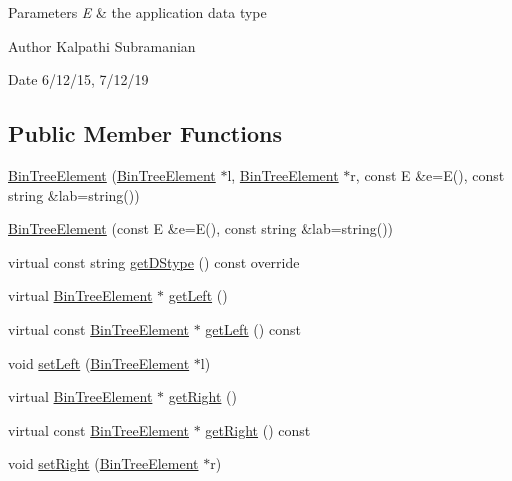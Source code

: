 \begin{DoxyParams}{Parameters}
{\em E} & the application data type\\
\hline
\end{DoxyParams}
\begin{DoxyAuthor}{Author}
Kalpathi Subramanian 
\end{DoxyAuthor}
\begin{DoxyDate}{Date}
6/12/15, 7/12/19 
\end{DoxyDate}
\subsection*{Public Member Functions}
\begin{DoxyCompactItemize}
\item 
\mbox{\hyperlink{classbridges_1_1datastructure_1_1_bin_tree_element_aaea6c57206cffc0be3204b971fcaf5dd}{Bin\+Tree\+Element}} (\mbox{\hyperlink{classbridges_1_1datastructure_1_1_bin_tree_element}{Bin\+Tree\+Element}} $\ast$l, \mbox{\hyperlink{classbridges_1_1datastructure_1_1_bin_tree_element}{Bin\+Tree\+Element}} $\ast$r, const E \&e=E(), const string \&lab=string())
\item 
\mbox{\hyperlink{classbridges_1_1datastructure_1_1_bin_tree_element_a0f17a369aeb864ea52cfd25ba6b48e89}{Bin\+Tree\+Element}} (const E \&e=E(), const string \&lab=string())
\item 
virtual const string \mbox{\hyperlink{classbridges_1_1datastructure_1_1_bin_tree_element_aef86e3663785972251547e409fdc757b}{get\+D\+Stype}} () const override
\item 
virtual \mbox{\hyperlink{classbridges_1_1datastructure_1_1_bin_tree_element}{Bin\+Tree\+Element}} $\ast$ \mbox{\hyperlink{classbridges_1_1datastructure_1_1_bin_tree_element_ab30cfe373892c52709d5f1df013a0c82}{get\+Left}} ()
\item 
virtual const \mbox{\hyperlink{classbridges_1_1datastructure_1_1_bin_tree_element}{Bin\+Tree\+Element}} $\ast$ \mbox{\hyperlink{classbridges_1_1datastructure_1_1_bin_tree_element_ae14a70e2d25ad62337c87059b0cadb48}{get\+Left}} () const
\item 
void \mbox{\hyperlink{classbridges_1_1datastructure_1_1_bin_tree_element_a3b3caddd57fd31963b248b4dbcf3df27}{set\+Left}} (\mbox{\hyperlink{classbridges_1_1datastructure_1_1_bin_tree_element}{Bin\+Tree\+Element}} $\ast$l)
\item 
virtual \mbox{\hyperlink{classbridges_1_1datastructure_1_1_bin_tree_element}{Bin\+Tree\+Element}} $\ast$ \mbox{\hyperlink{classbridges_1_1datastructure_1_1_bin_tree_element_ae1e6bde8cc03cf5da5a7930354fdf592}{get\+Right}} ()
\item 
virtual const \mbox{\hyperlink{classbridges_1_1datastructure_1_1_bin_tree_element}{Bin\+Tree\+Element}} $\ast$ \mbox{\hyperlink{classbridges_1_1datastructure_1_1_bin_tree_element_a795b1696d628b55dafb2bc1aa961843a}{get\+Right}} () const
\item 
void \mbox{\hyperlink{classbridges_1_1datastructure_1_1_bin_tree_element_a59a1f7bac555e8a9bd88fd4aa1bd9b82}{set\+Right}} (\mbox{\hyperlink{classbridges_1_1datastructure_1_1_bin_tree_element}{Bin\+Tree\+Element}} $\ast$r)
\end{DoxyCompactItemize}
